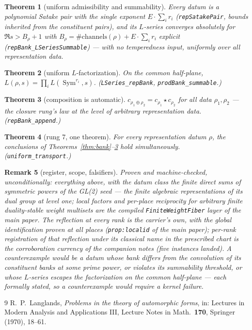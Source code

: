 \documentclass[11pt]{article}
\newtheorem{theorem}{Theorem}
\newtheorem{remark}[theorem]{Remark}
\newcommand{\Sym}{\operatorname{Sym}}
\begin{document}
\begin{theorem}[uniform admissibility and summability]\label{thm:summ}
Every datum is a polynomial Satake pair with the single exponent $E\cdot\sum_i r_i$
(\texttt{repSatakePair}, bounds inherited from the constituent pairs), and its $L$-series
converges absolutely for $\Re s>B_\rho+1$ with
$B_\rho=\#\mathrm{channels}(\rho)+E\cdot\sum_i r_i$ explicit
(\texttt{repBank\_LSeriesSummable}) --- with no temperedness input, uniformly over all
representation data.
\end{theorem}

\begin{theorem}[uniform $L$-factorization]\label{thm:fact}
On the common half-plane,
$L(\rho,s)=\prod_i L(\Sym^{r_i},s)$.  (\texttt{LSeries\_repBank},
\texttt{prodBank\_summable}.)
\end{theorem}

\begin{theorem}[composition is automatic]\label{thm:comp}
$c_{\rho_1\oplus\rho_2}=c_{\rho_1}\star c_{\rho_2}$ for all data $\rho_1,\rho_2$ ---
the closure rung's law at the level of arbitrary representation data.
(\texttt{repBank\_append}.)
\end{theorem}

\begin{theorem}[rung 7, one theorem]\label{thm:rung7}
For every representation datum $\rho$, the conclusions of
Theorems~\ref{thm:bank}--\ref{thm:comp} hold simultaneously.
(\texttt{uniform\_transport}.)
\end{theorem}

\begin{remark}[register, scope, falsifiers]
Proven and machine-checked, unconditionally: everything above, with the datum class the
finite direct sums of symmetric powers of the GL(2) seed --- the finite algebraic
representations of its dual group at level one; local factors and per-place reciprocity
for arbitrary finite duality-stable weight multisets are the compiled
\texttt{FiniteWeightFiber} layer of the main paper.  The reflection at every rank is the
carrier's own, with the global identification proven at all places
(\texttt{prop:localid} of the main paper); per-rank registration of that reflection under
its classical name in the prescribed chart is the corroboration currency of the companion
notes (five instances landed).  A counterexample would be a datum whose bank differs from
the convolution of its constituent banks at some prime power, or violates its summability
threshold, or whose $L$-series escapes the factorization on the common half-plane ---
each formally stated, so a counterexample would require a kernel failure.
\end{remark}

\begin{thebibliography}{9}
 R.~P.~Langlands, \emph{Problems in the theory of automorphic forms}, in:
Lectures in Modern Analysis and Applications III, Lecture Notes in Math.\ \textbf{170},
Springer (1970), 18--61.
\end{thebibliography}
\end{document}
